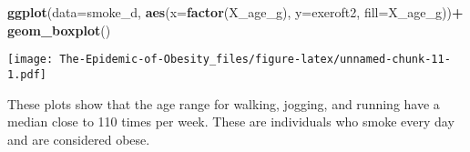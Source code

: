 \documentclass[
]{article}
\newenvironment{Shaded}{\begin{snugshade}}{\end{snugshade}}
\newcommand{\DataTypeTok}[1]{\textcolor[rgb]{0.13,0.29,0.53}{#1}}
\newcommand{\KeywordTok}[1]{\textcolor[rgb]{0.13,0.29,0.53}{\textbf{#1}}}
\newcommand{\NormalTok}[1]{#1}
\newcommand{\OperatorTok}[1]{\textcolor[rgb]{0.81,0.36,0.00}{\textbf{#1}}}
\newcommand{\StringTok}[1]{\textcolor[rgb]{0.31,0.60,0.02}{#1}}
\begin{document}
\begin{Shaded}
\begin{Highlighting}[]
\KeywordTok{ggplot}\NormalTok{(}\DataTypeTok{data=}\NormalTok{smoke_d, }\KeywordTok{aes}\NormalTok{(}\DataTypeTok{x=}\KeywordTok{factor}\NormalTok{(X_age_g), }\DataTypeTok{y=}\NormalTok{exeroft2, }\DataTypeTok{fill=}\NormalTok{X_age_g))}\OperatorTok{+}
\StringTok{ }\KeywordTok{geom_boxplot}\NormalTok{()}
\end{Highlighting}
\end{Shaded}

\texttt{[image: The-Epidemic-of-Obesity\_files/figure-latex/unnamed-chunk-11-1.pdf]}

These plots show that the age range for walking, jogging, and running
have a median close to 110 times per week. These are individuals who
smoke every day and are considered obese.
\end{document}
